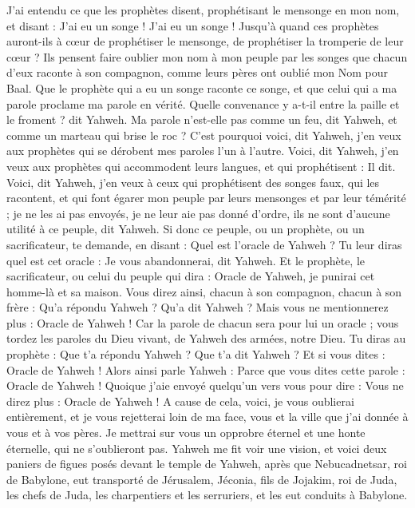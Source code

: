 \begin{multicols}{2}
J'ai entendu ce que les prophètes disent, prophétisant le mensonge en mon nom, et disant : J'ai eu un songe ! J’ai eu un songe !
Jusqu’à quand ces prophètes auront-ils à cœur de prophétiser le mensonge, de prophétiser la tromperie de leur cœur ?
Ils pensent faire oublier mon nom à mon peuple par les songes que chacun d'eux raconte à son compagnon, comme leurs pères ont oublié mon Nom pour Baal.
Que le prophète qui a eu un songe raconte ce songe, et que celui qui a ma parole proclame ma parole en vérité. Quelle convenance y a-t-il entre la paille et le froment ? dit Yahweh.
Ma parole n'est-elle pas comme un feu, dit Yahweh, et comme un marteau qui brise le roc ?
C'est pourquoi voici, dit Yahweh, j'en veux aux prophètes qui se dérobent mes paroles l’un à l’autre.
Voici, dit Yahweh, j'en veux aux prophètes qui accommodent leurs langues, et qui prophétisent : Il dit.
Voici, dit Yahweh, j'en veux à ceux qui prophétisent des songes faux, qui les racontent, et qui font égarer mon peuple par leurs mensonges et par leur témérité ; je ne les ai pas envoyés, je ne leur aie pas donné d’ordre, ils ne sont d’aucune utilité à ce peuple, dit Yahweh.
Si donc ce peuple, ou un prophète, ou un sacrificateur, te demande, en disant : Quel est l’oracle de Yahweh ? Tu leur diras quel est cet oracle : Je vous abandonnerai, dit Yahweh.
Et le prophète, le sacrificateur, ou celui du peuple qui dira : Oracle de Yahweh, je punirai cet homme-là et sa maison.
Vous direz ainsi, chacun à son compagnon, chacun à son frère : Qu'a répondu Yahweh ? Qu'a dit Yahweh ?
Mais vous ne mentionnerez plus : Oracle de Yahweh ! Car la parole de chacun sera pour lui un oracle ; vous tordez les paroles du Dieu vivant, de Yahweh des armées, notre Dieu.
Tu diras au prophète : Que t'a répondu Yahweh ? Que t'a dit Yahweh ?
Et si vous dites : Oracle de Yahweh ! Alors ainsi parle Yahweh : Parce que vous dites cette parole : Oracle de Yahweh ! Quoique j'aie envoyé quelqu’un vers vous pour dire : Vous ne direz plus : Oracle de Yahweh !
A cause de cela, voici, je vous oublierai entièrement, et je vous rejetterai loin de ma face, vous et la ville que j'ai donnée à vous et à vos pères.
Je mettrai sur vous un opprobre éternel et une honte éternelle, qui ne s’oublieront pas.
\VerseOne{}Yahweh me fit voir une vision, et voici deux paniers de figues posés devant le temple de Yahweh, après que Nebucadnetsar, roi de Babylone, eut transporté de Jérusalem, Jéconia, fils de Jojakim, roi de Juda, les chefs de Juda, les charpentiers et les serruriers, et les eut conduits à Babylone.

\end{multicols}
